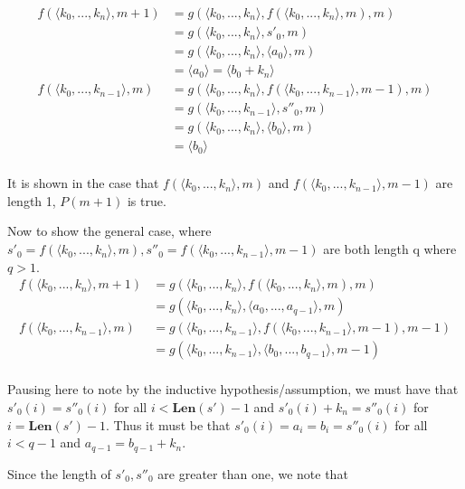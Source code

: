 \documentclass{article}
\newcommand{ \len }[0]{ \textbf{Len} }
\begin{document}
\begin{enumerate}
			\begin{align*}
				f(\langle k_0, ..., k_n \rangle, m + 1) &= g(\langle k_0, ..., k_n \rangle, f(\langle k_0, ..., k_n \rangle, m), m)\\			&= g(\langle k_0, ..., k_n \rangle, s'_{0}, m)\\
				&= g(\langle k_0, ..., k_n \rangle, \langle a_0 \rangle, m)\\
				&= \langle a_0 \rangle = \langle b_0 + k_n \rangle \\
				f(\langle k_0, ..., k_{n - 1} \rangle, m) &= g(\langle k_0, ..., k_n \rangle, f(\langle k_0, ..., k_{n - 1} \rangle, m - 1), m)\\			&= g(\langle k_0, ..., k_{n - 1} \rangle, s''_{0}, m)\\
				&= g(\langle k_0, ..., k_n \rangle, \langle b_0 \rangle, m)\\
				&= \langle b_0 \rangle\\
			\end{align*}			
			
			It is shown in the case that $f(\langle k_0, ..., k_n \rangle, m)$ and $f(\langle k_0, ..., k_{n - 1} \rangle, m - 1)$ are length 1, $P(m + 1)$ is true.
			
			\medskip
			Now to show the general case, where $s'_{0} = f(\langle k_0, ..., k_n \rangle, m), s''_{0} = f(\langle k_0, ..., k_{n - 1} \rangle, m - 1)$ are both length q where $q > 1$. 			
			\begin{align*}
				f(\langle k_0, ..., k_n \rangle, m + 1) &= g(\langle k_0, ..., k_n \rangle, f(\langle k_0, ..., k_n \rangle, m), m)\\
				&= g(\langle k_0, ..., k_n \rangle, \langle a_0, ..., a_{q - 1} \rangle, m)\\
				f(\langle k_0, ..., k_{n - 1} \rangle, m) &= g(\langle k_0, ..., k_{n - 1} \rangle, f(\langle k_0, ..., k_{n - 1} \rangle, m - 1), m - 1)\\
				&= g(\langle k_0, ..., k_{n - 1} \rangle, \langle b_0, ..., b_{q - 1} \rangle, m - 1)\\
			\end{align*}
			
			Pausing here to note by the inductive hypothesis/assumption, we must have that $s'_{0}(i) = s''_{0}(i)$ for all $i < \len(s') - 1$ and $s'_{0}(i) + k_n = s''_{0}(i)$ for $i = \len(s') - 1$. Thus it must be that $s'_{0}(i) = a_i = b_i = s''_{0}(i)$ for all $i < q - 1$ and $a_{q - 1} = b_{q - 1} + k_n$.
			
			\medskip
			Since the length of $s'_{0}, s''_{0}$ are greater than one, we note that 
			

\end{enumerate}
\end{document}
